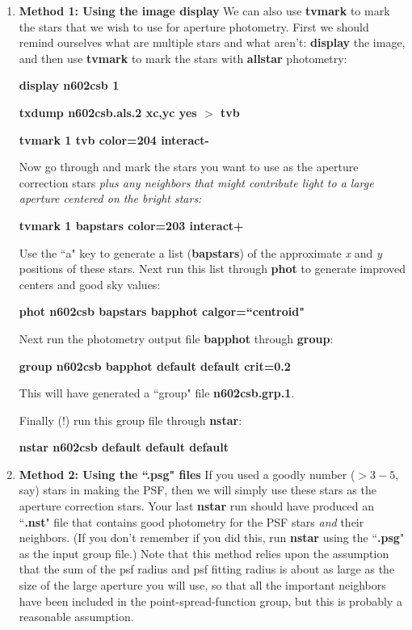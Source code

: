 \begin{enumerate}
 
\item {\bf Method 1: Using the image display}
We can also use {\bf tvmark} to mark the stars that we wish to use for
aperture photometry.  First we should remind ourselves what are multiple
stars and what aren't: {\bf display} the image, and then use {\bf
tvmark} to mark the stars with {\bf allstar} photometry:
 
\centerline{ {\bf display n602csb 1} }
 
\centerline{ {\bf txdump n602csb.als.2 xc,yc yes $>$ tvb} }
 
\centerline{ {\bf tvmark 1 tvb color=204 interact-} }
 
\noindent
Now go through and mark the stars you want to use as the aperture
correction stars {\it plus any neighbors that might contribute light
to a large aperture centered on the bright stars:}
 
\centerline{ {\bf tvmark 1 bapstars color=203 interact+ }}
 
\noindent
Use the ``a" key to generate a list ({\bf bapstars}) of the approximate
{\it x} and {\it y} positions of these stars.  Next run this list
through {\bf phot} to generate improved centers and good sky values:
 
\centerline{ {\bf phot n602csb bapstars bapphot calgor=``centroid" } }
 
\noindent
Next run the photometry output file {\bf bapphot} through {\bf group}:
 
\centerline{ {\bf group n602csb bapphot default default crit=0.2} }
 
\noindent
This will have generated a ``group" file {\bf n602csb.grp.1}.
 
\noindent 
Finally (!) run this group file through {\bf nstar}:
 
\centerline{ {\bf nstar n602csb default default default} }
 
\item {\bf Method 2: Using the ``.psg" files}
If you used a goodly number ($>3-5$, say) stars in
making the PSF, then we will simply use these stars as the aperture
correction stars.  Your last {\bf nstar} run should have produced an
``{\bf .nst}" file that contains good photometry for the PSF stars {\it
and} their neighbors. (If you don't remember if you did this, run {\bf
nstar} using the ``{\bf .psg}" as the input group file.)  Note that this
method relies upon the assumption that the sum of the psf radius and psf
fitting radius is about as large as the size of the large aperture you
will use, so that all the important neighbors have been included in the
point-spread-function group, but this is probably a reasonable
assumption.
 
\end{enumerate}
 
